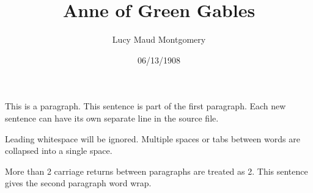 \documentclass[a4paper]{article}
\title{Anne of Green Gables}
\author{Lucy Maud Montgomery}
\date{06/13/1908}
\begin{document}
\maketitle

This is a paragraph.
This sentence is part of the first paragraph.
Each new sentence can have its own separate line in the source file.

                  Leading whitespace will be ignored.
Multiple  spaces   or tabs	between			words are collapsed into a single space.



More than 2 carriage returns between paragraphs are treated as 2.
This sentence gives the second paragraph word wrap.
\end{document}
